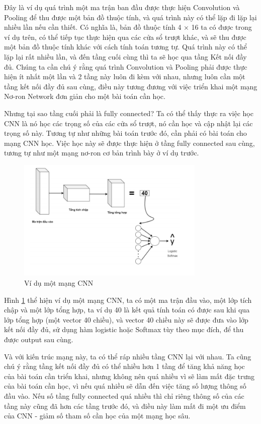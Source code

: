 \documentclass[a4paper]{article}
\begin{document}
Đây là ví dụ quá trình một ma trận ban đầu được thực hiện Convolution và Pooling để thu được một bản đồ thuộc tính, và quá trình này có thể lặp đi lặp lại nhiều lần nếu cần thiết. Có nghĩa là, bản đồ thuộc tính 4 × 16 ta có được trong ví dụ trên, có thể tiếp tục thực hiện qua các cửa sổ trượt khác, và sẽ thu được một bản đồ thuộc tính khác với cách tính toán tương tự. Quá trình này có thể lặp lại rất nhiều lần, và đến tầng cuối cùng thì ta sẽ học qua tầng Kết nối đầy đủ. Chúng ta cần chú ý rằng quá trình Convolution và Pooling phải được thực hiện ít nhất một lần và 2 tầng này luôn đi kèm với nhau, nhưng luôn cần một tầng kết nối đầy đủ sau cùng, điều này tương đương với việc triển khai một mạng Nơ-ron Network đơn giản cho một bài toán cần học.

Nhưng tại sao tầng cuối phải là fully connected? Ta có thể thấy thực ra việc học
CNN là nó học các trọng số của các cửa sổ trượt, nó cần học và cập nhật lại
các trọng số này. Tương tự như những bài toán trước đó, cần phải có bài toán cho
mạng CNN học. Việc học này sẽ được thực hiện ở tầng fully connected sau cùng,
tương tự như một mạng nơ-ron cơ bản trình bày ở ví dụ trước.


\begin{figure}
    \centering
    \includegraphics[width=0.8\textwidth]{image/cnnExample.png}
    \caption{Ví dụ một mạng CNN}
    \label{fig:cnnExample}
\end{figure}

Hình \ref{fig:cnnExample} thể hiện ví dụ một mạng CNN, ta có một ma trận đầu vào, một lớp tích
chập và một lớp tổng hợp, ta ví dụ 40 là kết quả tính toán có được sau khi qua lớp
tổng hợp (một vector 40 chiều), và vector 40 chiều này sẽ được đưa vào lớp kết nối
đầy đủ, sử dụng hàm logistic hoặc Softmax tùy theo mục đích, để thu được output
sau cùng.

Và với kiến trúc mạng này, ta có thể ráp nhiều tầng CNN lại với nhau. Ta cũng chú
ý rằng tầng kết nối đầy đủ có thể nhiều hơn 1 tầng để tăng khả năng học của bài
toán cần triển khai, nhưng không nên quá nhiều vì sẽ làm mất đặc trưng của bài toán cần học, vì nếu quá nhiều sẽ dẫn đến việc tăng số lượng thông số đầu vào. Nếu số tầng fully connected quá nhiều thì chỉ riêng thông số của các tầng này cũng đã hơn các tầng trước đó, và điều này làm mất đi một ưu điểm của CNN - giảm số tham số cần học của một mạng học sâu.
\end{document}
